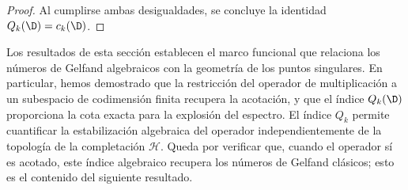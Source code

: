 \begin{proof}
	Al cumplirse ambas desigualdades, se concluye la identidad $Q_k(\D) = c_k(\D)$.
\end{proof}

Los resultados de esta sección establecen el marco funcional que relaciona los números de Gelfand algebraicos con la geometría de los puntos singulares. En particular, hemos demostrado que la restricción del operador de multiplicación a un subespacio de codimensión finita recupera la acotación, y que el índice $Q_k(\D)$ proporciona la cota exacta para la explosión del espectro. El índice $Q_k$ permite cuantificar la estabilización algebraica del operador independientemente de la topología de la completación $\mathcal{H}$. Queda por verificar que, cuando el operador sí es acotado, este índice algebraico recupera los números de Gelfand clásicos; esto es el contenido del siguiente resultado.
